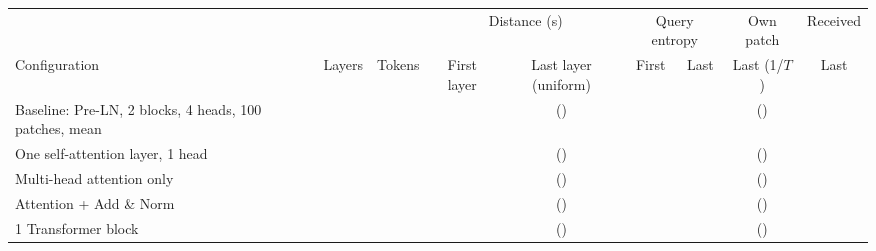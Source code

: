 \begin{tabular}{lrrcccccc}
\toprule
 & & & \multicolumn{2}{c}{Distance (s)} & \multicolumn{2}{c}{Query entropy} & Own patch & Received \\
\cmidrule(lr){4-5}\cmidrule(lr){6-7}
Configuration & Layers & Tokens & First layer & Last layer (uniform) & First & Last & Last (1/$T$) & Last \\
\midrule
Baseline: Pre-LN, 2 blocks, 4 heads, 100 patches, mean & \transformerAttnLayersBase{} & \transformerAttnTokensBase{} & \transformerAttnDistFirstBase{} & \transformerAttnDistLastBase{} (\transformerAttnDistUniformBase{}) & \transformerAttnQentropyFirstBase{} & \transformerAttnQentropyLastBase{} & \transformerAttnDiagLastBase{} (\transformerAttnUniformBase{}) & \transformerAttnRecvEntropyLastBase{} \\
One self-attention layer, 1 head & \transformerAttnLayersSaSingle{} & \transformerAttnTokensSaSingle{} & \transformerAttnDistFirstSaSingle{} & \transformerAttnDistLastSaSingle{} (\transformerAttnDistUniformSaSingle{}) & \transformerAttnQentropyFirstSaSingle{} & \transformerAttnQentropyLastSaSingle{} & \transformerAttnDiagLastSaSingle{} (\transformerAttnUniformSaSingle{}) & \transformerAttnRecvEntropyLastSaSingle{} \\
Multi-head attention only & \transformerAttnLayersMhsa{} & \transformerAttnTokensMhsa{} & \transformerAttnDistFirstMhsa{} & \transformerAttnDistLastMhsa{} (\transformerAttnDistUniformMhsa{}) & \transformerAttnQentropyFirstMhsa{} & \transformerAttnQentropyLastMhsa{} & \transformerAttnDiagLastMhsa{} (\transformerAttnUniformMhsa{}) & \transformerAttnRecvEntropyLastMhsa{} \\
Attention + Add \& Norm & \transformerAttnLayersNoFfn{} & \transformerAttnTokensNoFfn{} & \transformerAttnDistFirstNoFfn{} & \transformerAttnDistLastNoFfn{} (\transformerAttnDistUniformNoFfn{}) & \transformerAttnQentropyFirstNoFfn{} & \transformerAttnQentropyLastNoFfn{} & \transformerAttnDiagLastNoFfn{} (\transformerAttnUniformNoFfn{}) & \transformerAttnRecvEntropyLastNoFfn{} \\
1 Transformer block & \transformerAttnLayersLayersOne{} & \transformerAttnTokensLayersOne{} & \transformerAttnDistFirstLayersOne{} & \transformerAttnDistLastLayersOne{} (\transformerAttnDistUniformLayersOne{}) & \transformerAttnQentropyFirstLayersOne{} & \transformerAttnQentropyLastLayersOne{} & \transformerAttnDiagLastLayersOne{} (\transformerAttnUniformLayersOne{}) & \transformerAttnRecvEntropyLastLayersOne{} \\

\end{tabular}
